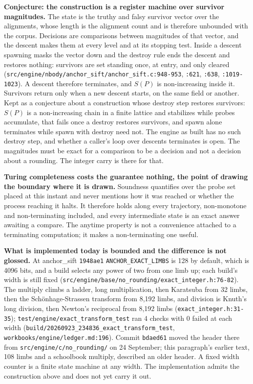 \textbf{Conjecture: the construction is a register machine over survivor magnitudes.} The state is the truthy and falsy survivor vector over the alignments, whose length is the alignment count and is therefore unbounded with the corpus. Decisions are comparisons between magnitudes of that vector, and the descent makes them at every level and at its stopping test. Inside a descent spawning masks the vector down and the destroy rule ends the descent and restores nothing: survivors are set standing once, at entry, and only cleared (\texttt{src/\allowbreak{}engine/\allowbreak{}nbody/\allowbreak{}anchor\_sift/\allowbreak{}anchor\_sift.c:948-953}, \texttt{:621}, \texttt{:638}, \texttt{:1019-1023}). A descent therefore terminates, and \(S(P)\) is non-increasing inside it. Survivors return only when a new descent starts, on the same field or another. Kept as a conjecture about a construction whose destroy step restores survivors: \(S(P)\) is a non-increasing chain in a finite lattice and stabilizes while probes accumulate, that fails once a destroy restores survivors, and spawn alone terminates while spawn with destroy need not. The engine as built has no such destroy step, and whether a caller's loop over descents terminates is open. The magnitudes must be exact for a comparison to be a decision and not a decision about a rounding. The integer carry is there for that.

\textbf{Turing completeness costs the guarantee nothing, the point of drawing the boundary where it is drawn.} Soundness quantifies over the probe set placed at this instant and never mentions how it was reached or whether the process reaching it halts. It therefore holds along every trajectory, non-monotone and non-terminating included, and every intermediate state is an exact answer awaiting a compare. The anytime property is not a convenience attached to a terminating computation; it makes a non-terminating one useful.

\textbf{What is implemented today is bounded and the difference is not glossed.} At anchor\_sift \texttt{1948ae1} \texttt{ANCHOR\_EXACT\_LIMBS} is 128 by default, which is 4096 bits, and a build selects any power of two from one limb up; each build's width is still fixed (\texttt{src/\allowbreak{}engine/\allowbreak{}base/\allowbreak{}no\_rounding/\allowbreak{}exact\_integer.h:76-82}). The multiply climbs a ladder, long multiplication, then Karatsuba from 32 limbs, then the Schönhage-Strassen transform from 8,192 limbs, and division is Knuth's long division, then Newton's reciprocal from 8,192 limbs (\texttt{exact\_integer.h:31-35}); \texttt{test/\allowbreak{}engine/\allowbreak{}exact\_transform\_test} ran 4 checks with 0 failed at each width (\texttt{build/\allowbreak{}20260923\_234836\_exact\_transform\_test}, \texttt{workbooks/\allowbreak{}engine/\allowbreak{}ledger.md:196}). Commit \texttt{bdaed61} moved the header there from \texttt{src/\allowbreak{}engine/\allowbreak{}c/\allowbreak{}no\_rounding/} on 24 September; this paragraph's earlier text, 108 limbs and a schoolbook multiply, described an older header. A fixed width counter is a finite state machine at any width. The implementation admits the construction above and does not yet carry it out.


